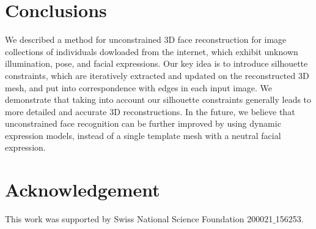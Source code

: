 

\section{Conclusions}
\label{sec:conclusions}

We described a method for unconstrained 3D face reconstruction for image collections of individuals dowloaded from the internet, which exhibit unknown illumination, pose, and facial expressions. Our key idea is to introduce silhouette constraints, which are iteratively extracted and updated on the reconstructed 3D mesh, and put into correspondence with edges in each input image. We demonstrate that taking into account our silhouette constraints generally leads to more detailed and accurate 3D reconstructions. In the future, we believe that unconstrained face recognition can be further improved by using dynamic expression models, instead of a single template mesh with a neutral facial expression.


\section{Acknowledgement}
\label{sec:acknowledgement}

This work was supported by Swiss National Science Foundation 200021$\_$156253.



\newpage

%




